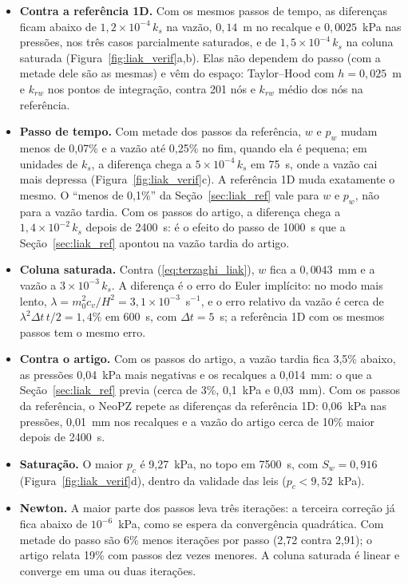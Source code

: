 \documentclass[11pt,a4paper]{article}
\begin{document}
\begin{itemize}[leftmargin=*]
\item \textbf{Contra a referência 1D.} Com os mesmos passos de tempo, as diferenças ficam abaixo de
  $1{,}2\times10^{-4}\,k_s$ na vazão, $0{,}14$~\textmu m no recalque e $0{,}0025$~kPa nas pressões,
  nos três casos parcialmente saturados, e de $1{,}5\times10^{-4}\,k_s$ na coluna saturada
  (Figura~\ref{fig:liak_verif}a,b). Elas não dependem do passo (com a metade dele são as mesmas) e
  vêm do espaço: Taylor--Hood com $h=0{,}025$~m e $k_{rw}$ nos pontos de integração, contra 201 nós
  e $k_{rw}$ médio dos nós na referência.
\item \textbf{Passo de tempo.} Com metade dos passos da referência, $w$ e $p_w$ mudam menos de
  0,07\% e a vazão até 0,25\% no fim, quando ela é pequena; em unidades de $k_s$, a diferença
  chega a $5\times10^{-4}\,k_s$ em 75~s, onde a vazão cai mais depressa
  (Figura~\ref{fig:liak_verif}c). A referência 1D muda exatamente o mesmo. O ``menos de 0,1\%''
  da Seção~\ref{sec:liak_ref} vale para $w$ e $p_w$, não para a vazão tardia. Com os passos do
  artigo, a diferença chega a $1{,}4\times10^{-2}\,k_s$ depois de 2400~s: é o efeito do passo de
  1000~s que a Seção~\ref{sec:liak_ref} apontou na vazão tardia do artigo.
\item \textbf{Coluna saturada.} Contra (\ref{eq:terzaghi_liak}), $w$ fica a $0{,}0043$~mm e a
  vazão a $3\times10^{-3}\,k_s$. A diferença é o erro do Euler implícito: no modo mais lento,
  $\lambda=m_0^2c_v/H^2=3{,}1\times10^{-3}$~s$^{-1}$, e o erro relativo da vazão é cerca de
  $\lambda^2\Delta t\,t/2=1{,}4\%$ em 600~s, com $\Delta t=5$~s; a referência 1D com os mesmos
  passos tem o mesmo erro.
\item \textbf{Contra o artigo.} Com os passos do artigo, a vazão tardia fica 3,5\% abaixo, as
  pressões 0,04~kPa mais negativas e os recalques a 0,014~mm: o que a Seção~\ref{sec:liak_ref}
  previa (cerca de 3\%, 0,1~kPa e 0,03~mm). Com os passos da referência, o NeoPZ repete as
  diferenças da referência 1D: 0,06~kPa nas pressões, 0,01~mm nos recalques e a vazão do artigo
  cerca de 10\% maior depois de 2400~s.
\item \textbf{Saturação.} O maior $p_c$ é 9,27~kPa, no topo em 7500~s, com $S_w=0{,}916$
  (Figura~\ref{fig:liak_verif}d), dentro da validade das leis ($p_c<9{,}52$~kPa).
\item \textbf{Newton.} A maior parte dos passos leva três iterações: a terceira correção já fica
  abaixo de $10^{-6}$~kPa, como se espera da convergência quadrática. Com metade do passo são 6\%
  menos iterações por passo (2,72 contra 2,91); o artigo relata 19\% com passos dez vezes menores.
  A coluna saturada é linear e converge em uma ou duas iterações.
\end{itemize}
\end{document}
